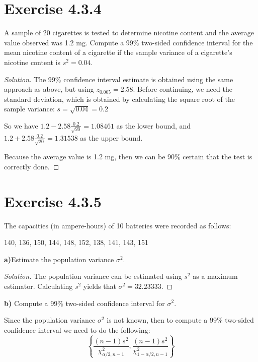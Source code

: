 \documentclass[titlepage, letterpaper]{article} %
\newcommand{\spacepls}{\vspace{5mm}}
\renewcommand\qedsymbol{\(\blacksquare\)}
\newenvironment{solution}
{\renewcommand\qedsymbol{$\square$}\begin{proof}[Solution]}
{\end{proof}}
\begin{document}
\spacepls

\section{Exercise 4.3.4}

{\large A sample of 20 cigarettes is tested to determine nicotine content and the average value observed was 1.2 mg.
Compute a 99\% two-sided confidence interval for the mean nicotine content of a cigarette if the sample variance of a cigarette's nicotine content is $s^2=0.04$.}

\begin{solution}
The 99\% confidence interval estimate is obtained using the same approach as above, but using $z_{0.005} = 2.58$.
Before continuing, we need the standard deviation,
which is obtained by calculating the square root of the sample variance:
$s = \sqrt{0.04} = 0.2$

So we have $1.2 - 2.58\frac{0.2}{\sqrt{20}} = 1.08461$ as the lower bound,
and $1.2 + 2.58\frac{0.2}{\sqrt{20}} = 1.31538$ as the upper bound.

Because the average value is 1.2 mg, then we can be 90\% certain that the test is correctly done.
\end{solution}

\spacepls

\section{Exercise 4.3.5}

{\large The capacities (in ampere-hours) of 10 batteries were recorded as follows:

140, 136, 150, 144, 148, 152, 138, 141, 143, 151

\textbf{a)}Estimate the population variance $\sigma^2$.}

\begin{solution}
The population variance can be estimated using $s^2$ as a maximum estimator.
Calculating $s^2$ yields that $\sigma^2 = 32.23333$.
\end{solution}

\spacepls

{\large \textbf{b)} Compute a 99\% two-sided confidence interval for $\sigma^2$.}

Since the population variance $\sigma^2$ is not known,
then to compute a 99\% two-sided confidence interval we need to do the following:
\[\left\{\frac{(n-1)s^2}{\chi_{\alpha /2 ,n-1}^2}, \frac{(n-1)s^2}{\chi_{1 - \alpha /2 , n-1}^2}\right\}\]
\end{document}
